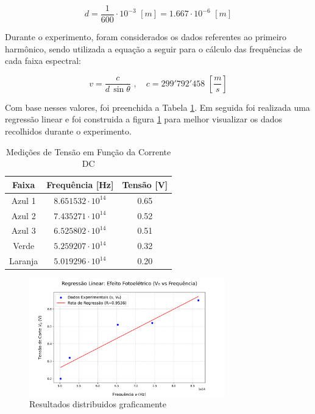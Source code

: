 \documentclass[10pt,twocolumn,letterpaper]{article}
\begin{document}
\vspace{-.5cm}

\begin{equation*}
    d = \frac{1}{600}\cdot10^{-3}\,\,[m] = 1.667 \cdot 10^{-6} \,\, [m]
\end{equation*}

\vspace{-.1cm}

\hspace{1cm} Durante o experimento, foram considerados os dados referentes ao primeiro harmônico, sendo utilizada a equação a seguir para o cálculo das frequências de cada faixa espectral:

\vspace{-.25cm}

\begin{equation*}
    v = \frac{c}{d\,\sin{\theta}}\,\,, \quad c = 299'792'458 \,\, \left[\frac{m}{s}\right]
\end{equation*}

\hspace{1cm} Com base nesses valores, foi preenchida a Tabela \ref{tab:medicoes_tensao}. Em seguida foi realizada uma regressão linear e foi construida a figura \ref{fig:grafico} para melhor visualizar os dados recolhidos durante o experimento.

\begin{table}[htbp]
    \centering
    \caption{Medições de Tensão em Função da Corrente DC}
    \label{tab:medicoes_tensao}
    \vspace{0.25cm}
    \begin{tabular}{ccc}
        \hline
        \rule{0pt}{3ex}\textbf{Faixa} & \textbf{Frequência} [Hz] & \textbf{Tensão} [V]\\[5pt]
        \hline
        \rule{0pt}{3ex}Azul 1 & $8.651532\cdot 10^{14}$ & 0.65 \\
        Azul 2 & $7.435271\cdot 10^{14}$ & 0.52 \\
        Azul 3 & $6.525802\cdot 10^{14}$ & 0.51 \\
        Verde & $5.259207\cdot 10^{14}$ & 0.32 \\
        Laranja & $5.019296\cdot 10^{14}$ & 0.20 \\[5pt]
        \hline
    \end{tabular}
\end{table}

\begin{figure}[h]
    \centering
    \includegraphics[width=8.5cm]{efeito_fotoeletrico_regressao.pdf}
    \caption{Resultados distribuidos graficamente}
    \label{fig:grafico}
\end{figure}
\end{document}
